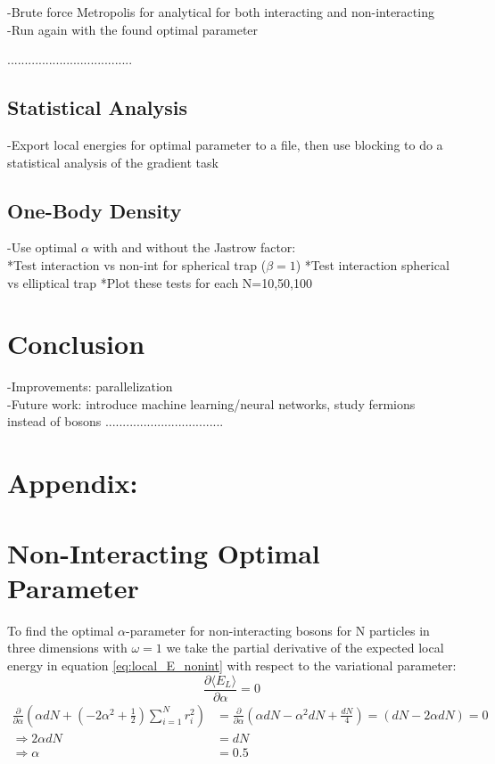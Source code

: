 \documentclass[12pt,a4paper,english]{article}
\begin{document}
-Brute force Metropolis for analytical for both interacting and non-interacting\\
-Run again with the found optimal parameter




....................................
\subsection{Statistical Analysis}
\label{subsect:Result_analysis}
-Export local energies for optimal parameter to a file, then use blocking to do a statistical analysis of the gradient task
\subsection{One-Body Density}
\label{subsect:Result_onbody}
-Use optimal $\alpha$ with and without the Jastrow factor:\\
     *Test interaction vs non-int for spherical trap ($\beta=1$)
     *Test interaction spherical vs elliptical trap
     *Plot these tests for each N=10,50,100
\section{Conclusion}
\label{sect:Conclusion}
-Improvements: parallelization\\
-Future work: introduce machine learning/neural networks, study fermions instead of bosons
..................................

\appendix
\section*{Appendix:}
\section{Non-Interacting Optimal Parameter}
\label{appendix:Optimal_alpha}
To find the optimal $\alpha$-parameter for non-interacting bosons for N particles in three dimensions with $\omega=1$ we take the partial derivative of the expected local energy in equation \ref{eq:local_E_nonint} with respect to the variational parameter:
\[\frac{\partial \langle E_L\rangle}{\partial \alpha}=0\]
\begin{align*}
\frac{\partial}{\partial \alpha}\left(\alpha dN+(-2\alpha^2+\frac{1}{2})\sum_{i=1}^{N}r_i^2\right)&=\frac{\partial}{\partial \alpha}\left(\alpha dN-\alpha^2dN+\frac{dN}{4}\right)=(dN-2\alpha dN)=0\\
\Rightarrow 2\alpha dN&=dN\\
\Rightarrow \alpha&=0.5
\end{align*}
\end{document}
